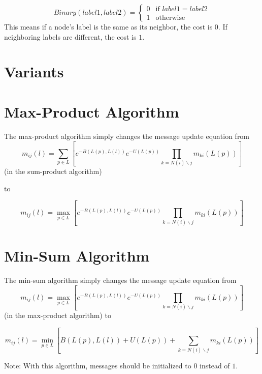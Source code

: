 \documentclass[a4paper,10pt]{article}
\begin{document}
\begin{equation}
Binary(label1, label2) = 
\begin{cases} 
0 & \text{if } label1 = label2
\\
1 &\text{otherwise}
\end{cases}
\end{equation}
This means if a node's label is the same as its neighbor, the cost is $0$. If neighboring labels are different, the cost is $1$.

\section{Variants}
\section{Max-Product Algorithm}
The max-product algorithm simply changes the message update equation from
\begin{equation}
m_{ij}(l) = \sum_{p \in L} \left[ e^{-B(L(p), L(l))} e^{-U(L(p))} \prod_{k=N(i)\backslash j}  m_{ki}(L(p)) \right]
\end{equation}
(in the sum-product algorithm)

to

\begin{equation}
m_{ij}(l) = \max_{p \in L} \left[ e^{-B(L(p), L(l))} e^{-U(L(p))} \prod_{k=N(i)\backslash j}  m_{ki}(L(p))  \right]
\end{equation}

\section{Min-Sum Algorithm}
The min-sum algorithm simply changes the message update equation from 
\begin{equation}
m_{ij}(l) = \max_{p \in L} \left[ e^{-B(L(p), L(l))} e^{-U(L(p))} \prod_{k=N(i)\backslash j}  m_{ki}(L(p))  \right]
\end{equation}
(in the max-product algorithm) to

\begin{equation}
m_{ij}(l) = \min_{p \in L} \left[ B(L(p), L(l)) + U(L(p)) + \sum_{k=N(i)\backslash j}  m_{ki}(L(p))  \right]
\end{equation}

Note: With this algorithm, messages should be initialized to $0$ instead of $1$.
\end{document}
